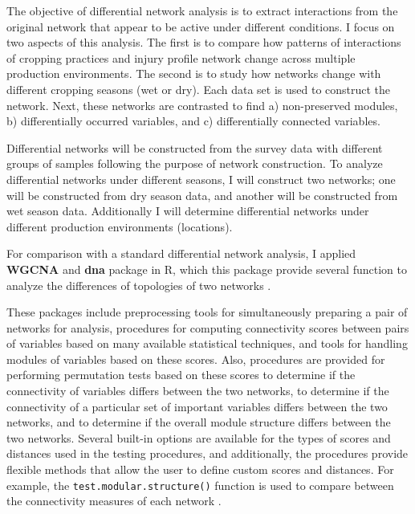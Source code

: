 The objective of differential network analysis is to extract interactions from the original network that appear to be active under different conditions. I focus on two aspects of this analysis. The first is to compare how patterns of interactions of cropping practices and injury profile network change across multiple production environments. The second is to study how networks change with different cropping seasons (wet or dry). Each data set is used to construct the network. Next, these networks are contrasted to find a) non-preserved modules, b) differentially occurred variables, and c) differentially connected variables.

Differential networks will be constructed from the survey data with different groups of samples following the purpose of network construction. To analyze differential networks under different seasons, I will construct two networks; one will be constructed from dry season data, and another will be constructed from wet season data. Additionally I will determine differential networks under different production environments (locations).

For comparison with a standard differential network analysis, I applied \textbf{WGCNA}  and \textbf{dna}  package in R, which this package provide several function to analyze the differences of topologies of two networks . 

These packages include preprocessing tools for simultaneously preparing a pair of networks for analysis, procedures for computing connectivity scores between pairs of variables based on many available statistical techniques, and tools for handling modules of variables based on these scores. Also, procedures are provided for performing permutation tests based on these scores to determine if the connectivity of variables differs between the two networks, to determine if the connectivity of a particular set of important variables differs between the two networks, and to determine if the overall module structure differs between the two networks. Several built-in options are available for the types of scores and distances used in the testing procedures, and additionally, the procedures provide flexible methods that allow the user to define custom scores and distances. For example, the \texttt{test.modular.structure()} function is used to compare between the connectivity measures of each network . 

